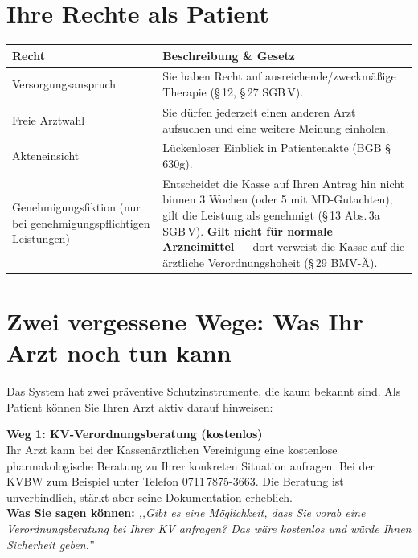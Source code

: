 \documentclass[a4paper]{umbruch-position}
\begin{document}
\newpage
\section{Ihre Rechte als Patient}

\begin{tabularx}{\textwidth}{p{3.5cm} X}
\toprule
\textbf{Recht} & \textbf{Beschreibung \& Gesetz} \\
\midrule
Versorgungsanspruch & Sie haben Recht auf ausreichende/zweckm\"a\ss{}ige Therapie (\S\,12, \S\,27 SGB\,V). \\
Freie Arztwahl & Sie d\"urfen jederzeit einen anderen Arzt aufsuchen und eine weitere Meinung einholen. \\
Akteneinsicht & L\"uckenloser Einblick in Patientenakte (BGB \S\,630g). \\
Genehmigungsfiktion (nur bei genehmigungspflichtigen Leistungen) & Entscheidet die Kasse auf Ihren Antrag hin nicht binnen 3 Wochen (oder 5 mit MD-Gutachten), gilt die Leistung als genehmigt (\S\,13 Abs.\,3a SGB\,V). \textbf{Gilt nicht f\"ur normale Arzneimittel} --- dort verweist die Kasse auf die \"arztliche Verordnungshoheit (\S\,29 BMV-\"A). \\
\bottomrule
\end{tabularx}

\section{Zwei vergessene Wege: Was Ihr Arzt noch tun kann}

Das System hat zwei pr\"aventive Schutzinstrumente, die kaum bekannt sind. Als Patient k\"onnen Sie Ihren Arzt aktiv darauf hinweisen:

\begin{infobox}
\textbf{Weg 1: KV-Verordnungsberatung (kostenlos)}\\
Ihr Arzt kann bei der Kassen\"arztlichen Vereinigung eine kostenlose pharmakologische Beratung zu Ihrer konkreten Situation anfragen. Bei der KVBW zum Beispiel unter Telefon 0711\,7875-3663. Die Beratung ist unverbindlich, st\"arkt aber seine Dokumentation erheblich.\\[4pt]
\textbf{Was Sie sagen k\"onnen:} \textit{,,Gibt es eine M\"oglichkeit, dass Sie vorab eine Verordnungsberatung bei Ihrer KV anfragen? Das w\"are kostenlos und w\"urde Ihnen Sicherheit geben.''}
\end{infobox}
\end{document}
